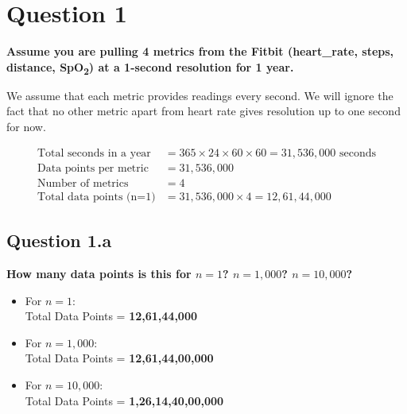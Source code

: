 \documentclass[a4paper, 12pt]{article}
\begin{document}
\tableofcontents

\break


\section*{Question 1}
\textbf{Assume you are pulling 4 metrics from the Fitbit (heart\_rate, steps, distance, SpO\textsubscript{2}) at a 1-second resolution for 1 year.}

\vspace{1em}

We assume that each metric provides readings every second. We will ignore the fact that no other metric apart from heart rate gives resolution up to one second for now.

\begin{align*}
\text{Total seconds in a year} &= 365 \times 24 \times 60 \times 60 = 31,536,000 \text{ seconds} \\
\text{Data points per metric} &= 31,536,000 \\
\text{Number of metrics} &= 4 \\
\text{Total data points (n=1)} &= 31,536,000 \times 4 = 12,61,44,000
\end{align*}

\vspace{1em}

\subsection*{Question 1.a}
\textbf{How many data points is this for $n=1$? $n=1{,}000$? $n=10{,}000$?}

\vspace{0.5em}

\begin{itemize}
    \item For $n = 1$: \\
    \quad Total Data Points = \textbf{12,61,44,000}
    
    \item For $n = 1,000$: \\
    \quad Total Data Points = \textbf{12,61,44,00,000}
    
    \item For $n = 10,000$: \\
    \quad Total Data Points = \textbf{1,26,14,40,00,000}
\end{itemize}
\end{document}
